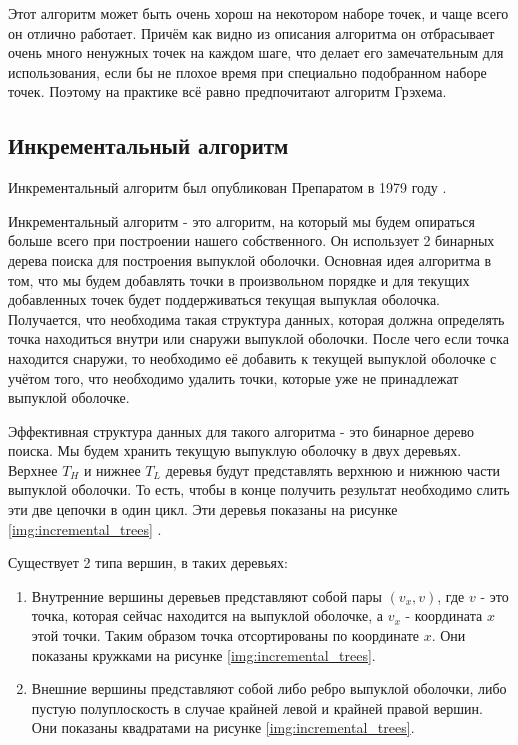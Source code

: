 Этот алгоритм может быть очень хорош на некотором наборе точек, и чаще всего он отлично работает. Причём как видно из описания алгоритма он отбрасывает очень много ненужных точек на каждом шаге, что делает его замечательным для использования, если бы не плохое время при специально подобранном наборе точек. Поэтому на практике всё равно предпочитают алгоритм Грэхема.

\subsection{Инкрементальный алгоритм} \label{subsect1_1_5}

Инкрементальный алгоритм был опубликован Препаратом в 1979 году \cite{preparata1979Incremental}.

Инкрементальный алгоритм - это алгоритм, на который мы будем опираться больше всего при построении нашего собственного. Он использует 2 бинарных дерева поиска для построения выпуклой оболочки. Основная идея алгоритма в том, что мы будем добавлять точки в произвольном порядке и для текущих добавленных точек будет поддерживаться текущая выпуклая оболочка. Получается, что необходима такая структура данных, которая должна определять точка находиться внутри или снаружи выпуклой оболочки. После чего если точка находится снаружи, то необходимо её добавить к текущей выпуклой оболочке с учётом того, что необходимо удалить точки, которые уже не принадлежат выпуклой оболочке.

Эффективная структура данных для такого алгоритма - это бинарное дерево поиска. Мы будем хранить текущую выпуклую оболочку в двух деревьях. Верхнее $T_H$ и нижнее $T_L$ деревья будут представлять верхнюю и нижнюю части выпуклой оболочки. То есть, чтобы в конце получить результат необходимо слить эти две цепочки в один цикл. Эти деревья показаны на рисунке \ref{img:incremental_trees} \cite{instructor2004incremental}.

Существует 2 типа вершин, в таких деревьях:
\begin{enumerate}
	\item Внутренние вершины деревьев представляют собой пары $(v_x, v)$, где $v$ - это точка, которая сейчас находится на выпуклой оболочке, а $v_x$ - координата $x$ этой точки. Таким образом точка отсортированы по координате $x$. Они показаны кружками на рисунке \ref{img:incremental_trees}.
	\item Внешние вершины представляют собой либо ребро выпуклой оболочки, либо пустую полуплоскость в случае крайней левой и крайней правой вершин. Они показаны квадратами на рисунке \ref{img:incremental_trees}.
\end{enumerate}

